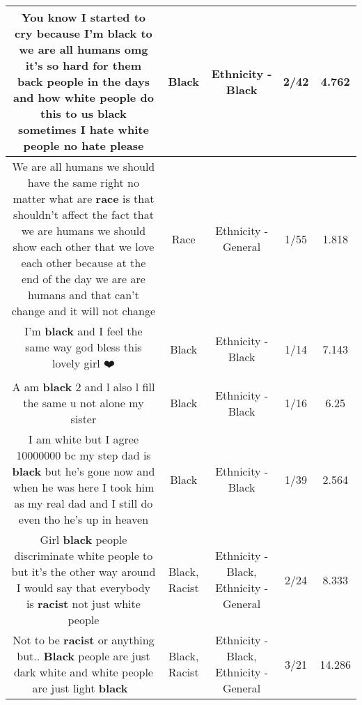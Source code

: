 \documentclass[11pt]{article}
\newlength\mylength
\begin{document}
\begin{center}
\begin{longtable}{|C{.65\mylength}|C{.30\mylength}|C{.12\mylength}|C{.12\mylength}|C{.12\mylength}|}
  \small You know I started to cry because I'm \textbf{black} to we are all humans omg it's so hard for them back people in the days and how white people do this to us \textbf{black} sometimes I hate white people no hate please\normalsize   & Black & Ethnicity - Black & 2/42 & 4.762 \\  \hline
  \small We are all humans we should have the same right no matter what are \textbf{race} is that shouldn't affect the fact that we are humans  we should show each other that we love each other because at the end of the day we are are humans and that can't change and it will not change\normalsize   & Race & Ethnicity - General & 1/55 & 1.818 \\  \hline
  \small I'm \textbf{black} and I feel the same way god bless this lovely girl ❤️\normalsize   & Black & Ethnicity - Black & 1/14 & 7.143 \\  \hline
  \small A am \textbf{black} 2 and l also l fill the same u not alone my sister\normalsize   & Black & Ethnicity - Black & 1/16 & 6.25 \\  \hline
  \small I am white but I agree 10000000 bc my step dad is \textbf{black} but he's gone now and when he was here I took him as my real dad and I still do even tho he's up in heaven\normalsize   & Black & Ethnicity - Black & 1/39 & 2.564 \\  \hline
  \small Girl \textbf{black} people discriminate white people to but it's the other way around I would say that everybody is \textbf{racist} not just white people\normalsize   & Black, Racist & Ethnicity - Black, Ethnicity - General & 2/24 & 8.333 \\  \hline
  \small Not to be \textbf{racist} or anything but.. \textbf{Black} people are just dark white and white people are just light \textbf{black} 💁\normalsize   & Black, Racist & Ethnicity - Black, Ethnicity - General & 3/21 & 14.286 \\  \hline

\end{longtable}
\end{center}
\end{document}
